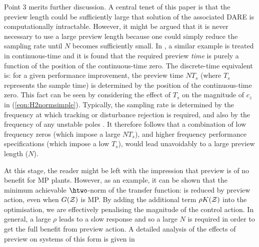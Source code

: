 Point 3 merits further discussion. A central tenet of this paper is that the preview length could be sufficiently large that solution of the associated {DARE} is computationally intractable. However, it might be argued that it is never necessary to use a large preview length because one could simply reduce the sampling rate until $N$ becomes sufficiently small.  In \cite{Middleteon_2004_PrevPerf}, a similar example is treated in continuous-time and it is found that the required preview \textit{time} is purely a function of the position of the continuous-time zero. The discrete-time equivalent is: for a given performance improvement, the preview time $NT_s$ (where $T_s$ represents the sample time) is determined by the position of the continuous-time zero. This fact can be seen by considering the effect of $T_s$ on the magnitude of $c_z$ in (\ref{eqn:H2normsimple}). Typically, the sampling rate is determined by the frequency at which tracking or disturbance rejection is required, and also by the frequency of any unstable poles \citep{Houpis_1991_DigitalControlSystems}. It therefore follows that a combination of low frequency zeros (which impose a large $NT_s$), and higher frequency performance specifications (which impose a low $T_s$), would lead unavoidably to a large preview length ($N$).%


At this stage, the reader might be left with the impression that preview is of no benefit for {MP} plants. However, as an example, it can be shown that the minimum achievable $\htwo$-norm of the transfer function:
is reduced by preview action, even when $G(\mathcal{Z})$ is {MP}. By adding the additional term $\rho K(\mathcal{Z})$ into the optimisation,
we are effectively penalising the magnitude of the control action. In general, a large $\rho$ leads to a slow response and so a large $N$ is required in order to get the full benefit from preview action. A detailed analysis of the effects of preview on systems of this form is given in \cite[Chapter 4]{Hazell_2007_Thesis}


